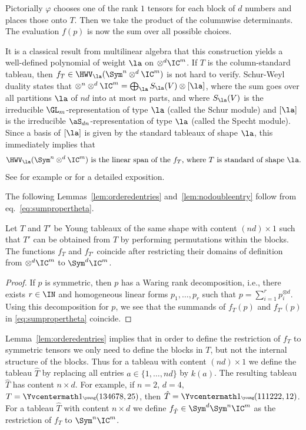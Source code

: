 Pictorially $\varphi$ chooses one of the rank $1$ tensors for each block of $d$ numbers and places those onto $T$.
Then we take the product of the columnwise determinants.
The evaluation $f(p)$ is now the sum over all possible choices.

It is a classical result from multilinear algebra that this construction yields a well-defined polynomial of weight $\la$ on $\otimes^d \IC^m$.
If $T$ is the column-standard tableau, then $f_T \in \HWV_\la(\Sym^n\otimes^d \IC^m)$ is not hard to verify.
Schur-Weyl duality states that
$\otimes^n \otimes^d \IC^m = \bigoplus_{\la} S_\la(V) \otimes [\la]$,
where the sum goes over all partitions $\la$ of $nd$ into at most $m$ parts,
and where $S_\la(V)$ is the irreducible $\GL_m$-representation of type $\la$ (called the Schur module) and $[\la]$ is the irreducible $\aS_{dn}$-representation of type $\la$ (called the Specht module).
Since a basis of $[\la]$ is given by the standard tableaux of shape $\la$,
this immediately implies that
\begin{equation}\label{eq:span}
\text{$\HWV_\la(\Sym^n\otimes^d \IC^m)$ is the linear span of the $f_T$, where $T$ is standard of shape $\la$.}
\end{equation} See for example \cite{Ott:13} or \cite[Ch.~19]{BI:17} for a detailed exposition.

The following Lemmas~\ref{lem:orderedentries} and~\ref{lem:nodoubleentry} follow from eq.~\eqref{eq:sumpropertheta}.

\begin{lemma}\label{lem:orderedentries}
Let $T$ and $T'$ be Young tableaux of the same shape with content $(nd)\times 1$ such that $T'$ can be obtained from $T$ by performing permutations within the blocks.
The functions $f_T$ and $f_{T'}$ coincide after restricting their domains of definition from $\otimes^d\IC^m$ to $\Sym^d\IC^m$.
\end{lemma}
\begin{proof}
If $p$ is symmetric, then $p$ has a Waring rank decomposition, i.e., there exists $r\in\IN$ and homogeneous linear forms $p_1,\ldots,p_r$ such that $p=\sum_{i=1}^r p_i^{\otimes d}$.
Using this decomposition for $p$, we see that the summands of $f_T(p)$ and $f_{T'}(p)$ in \eqref{eq:sumpropertheta} coincide.
\end{proof}

Lemma~\ref{lem:orderedentries} implies that in order to define the restriction of $f_T$ to symmetric tensors we only need to define the blocks in $T$, but not the internal structure of the blocks.
Thus for a tableau with content $(nd)\times 1$ we define the tableau $\hat T$ by replacing all entries $a \in\{1,\ldots,nd\}$ by $k(a)$.
The resulting tableau $\hat T$ has content $n \times d$.
For example, if $n=2$, $d=4$,  $T={\Yvcentermath1\tiny\young(134678,25)}$, then $\hat T = {\Yvcentermath1\tiny\young(111222,12)}$.
For a tableau $\hat T$ with content $n \times d$ we define $f_{\hat T} \in \Sym^d \Sym^n \IC^m$ as the restriction of $f_T$ to $\Sym^n\IC^m$.

